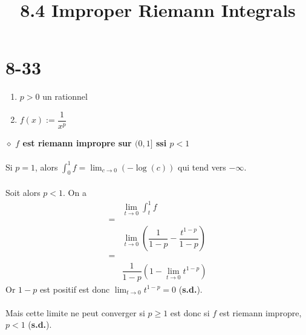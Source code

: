 \documentclass[a4paper,10pt]{article}
\title{8.4 Improper Riemann Integrals}
\begin{document}
\maketitle

\section*{8-33}
\begin{enumerate}
 \item $p > 0$ un rationnel
 \item $f(x) := \dfrac{1}{x^p}$
\end{enumerate}
$\diamond$ \textbf{$f$ est riemann impropre sur $(0,1]$ ssi $p < 1$}  
\\
\\
Si $p = 1$, alors $\int_0^1 f = \lim_{c \to 0}(-\log(c))$ qui tend vers $-\infty$.
\\
\\
Soit alors $p < 1$. On a
\begin{align*}
 & \lim_{t \to 0} \int_t^1 f \\
 = \\
 & \lim_{t \to 0}(\dfrac{1}{1-p} - \dfrac{t^{1-p}}{1-p}) \\
 = \\
 & \dfrac{1}{1-p}(1 - \lim_{t \to 0} t^{1-p}) 
\end{align*}
Or $1-p$ est positif est donc $\lim_{t \to 0} t^{1-p} = 0$ (\textbf{s.d.}).
\\
\\
Mais cette limite ne peut converger si $p \geq 1$ est donc si $f$ est riemann impropre, $p < 1$ (\textbf{s.d.}).
\end{document}
